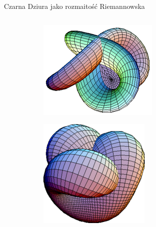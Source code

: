 \documentclass[polish, 9pt, xcolor=table, hyperref={pdfpagemode=FullScreen}]{beamer}
\begin{document}
\begin{frame}{Czarna Dziura jako rozmaitość Riemannowska}
\begin{columns}
\begin{column}{0.6\textwidth}
\begin{figure}
\begin{subfigure}[b]{0.4\textwidth}
    \end{subfigure}
  \end{figure}
  \begin{figure}
    \begin{subfigure}{0.4\textwidth}
        \includegraphics[width=\textwidth]{ilustracje/rozmaitosc1.png}
    \end{subfigure}
    \begin{subfigure}{0.4\textwidth}
        \includegraphics[width=\textwidth]{ilustracje/BoysSurfaceTopView.PNG}
    \end{subfigure}
\end{figure}
\end{column}
\end{columns}

\end{frame}
\end{document}
